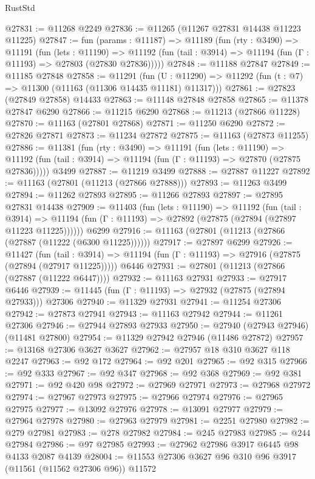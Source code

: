 \begin{lexlean}{RustStd}
\begin{coremodule}
@27831 := @11268 @2249
@27836 := @11265 (@11267 @27831 @14438 @11223 @11225)
@27847 := fun (params : @11187) =>
  @11189
    (fun (rty : @3490) =>
    @11191
      (fun (lets : @11190) =>
      @11192 (fun (tail : @3914) => @11194 (fun (Γ : @11193) => @27803 (@27830 @27836)))))
@27848 := @11188 @27847
@27849 := @11185 @27848
@27858 := @11291
    (fun (U : @11290) => @11292 (fun (t : @7) => @11300 (@11163 (@11306 @14435 @11181) @11317)))
@27861 := @27823 (@27849 @27858) @14433
@27863 := @11148 @27848 @27858
@27865 := @11378 @27847 @6290
@27866 := @11215 @6290
@27868 := @11213 (@27866 @11228)
@27870 := @11163 (@27801 @27868)
@27871 := @11250 @6290
@27872 := @27826 @27871
@27873 := @11234 @27872
@27875 := @11163 (@27873 @11255)
@27886 := @11381
    (fun (rty : @3490) =>
    @11191
      (fun (lets : @11190) =>
      @11192 (fun (tail : @3914) => @11194 (fun (Γ : @11193) => @27870 (@27875 @27836)))))
    @3499
@27887 := @11219 @3499
@27888 := @27887 @11227
@27892 := @11163 (@27801 (@11213 (@27866 @27888)))
@27893 := @11263 @3499
@27894 := @11262 @27893
@27895 := @11266 @27893
@27897 := @27895 @27831 @14438
@27909 := @11403
    (fun (lets : @11190) =>
    @11192
      (fun (tail : @3914) =>
      @11194 (fun (Γ : @11193) => @27892 (@27875 (@27894 (@27897 @11223 @11225))))))
    @6299
@27916 := @11163 (@27801 (@11213 (@27866 (@27887 (@11222 (@6300 @11225))))))
@27917 := @27897 @6299
@27926 := @11427
    (fun (tail : @3914) => @11194 (fun (Γ : @11193) => @27916 (@27875 (@27894 (@27917 @11225)))))
    @6446
@27931 := @27801 (@11213 (@27866 (@27887 (@11222 @6447))))
@27932 := @11163 @27931
@27933 := @27917 @6446
@27939 := @11445 (fun (Γ : @11193) => @27932 (@27875 (@27894 @27933))) @27306
@27940 := @11329 @27931
@27941 := @11254 @27306
@27942 := @27873 @27941
@27943 := @11163 @27942
@27944 := @11261 @27306
@27946 := @27944 @27893 @27933
@27950 := @27940 (@27943 @27946) (@11481 @27800)
@27954 := @11329 @27942 @27946 (@11486 @27872)
@27957 := @13168 @27306 @3627 @3627
@27962 := @27957 @18 @310 @3627 @118 @2247
@27963 := @92 @172
@27964 := @92 @201
@27965 := @92 @315
@27966 := @92 @333
@27967 := @92 @347
@27968 := @92 @368
@27969 := @92 @381
@27971 := @92 @420 @98
@27972 := @27969 @27971
@27973 := @27968 @27972
@27974 := @27967 @27973
@27975 := @27966 @27974
@27976 := @27965 @27975
@27977 := @13092 @27976
@27978 := @13091 @27977
@27979 := @27964 @27978
@27980 := @27963 @27979
@27981 := @2251 @27980
@27982 := @279 @27981
@27983 := @278 @27982
@27984 := @245 @27983
@27985 := @244 @27984
@27986 := @97 @27985
@27993 := @27962 @27986 @3917 @6445 @98 @4133 @2087 @4139
@28004 := @11553 @27306 @3627 @96 @310 @96 @3917 (@11561 (@11562 @27306 @96)) @11572

\end{coremodule}
\end{lexlean}
